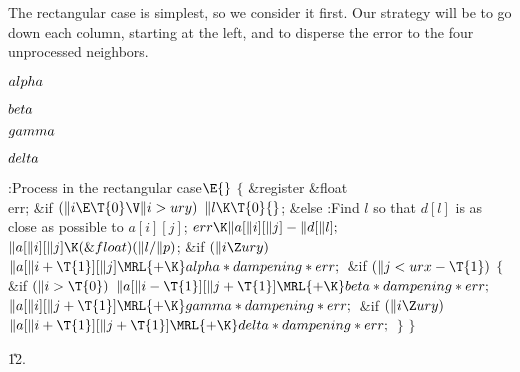 The rectangular case is simplest, so we consider it first. Our strategy
will be to go down each column, starting at the left, and to disperse the
error to the four unprocessed neighbors.

\Y\B\4\D$\\{alpha}$ \5
\par
\B\4\D$\\{beta}$ \5
\par
\B\4\D$\\{gamma}$ \5
\par
\B\4\D$\\{delta}$ \5
\par
\Y\B\4:Process  in the rectangular case\X${}\E{}$\6
${}\{{}$\5
\1\&{register} \&{float} \\{err};\7
\&{if} ${}(\|i\E\T{0}\V\|i>\\{ury}){}$\1\5
${}\|l\K\T{0}{}$;\2\6
\&{else}\1\5
:Find $l$ so that $d[l]$ is as close as possible to $a[i][j]$\X;\2\6
${}\\{err}\K\|a[\|i][\|j]-\|d[\|l];{}$\6
${}\|a[\|i][\|j]\K(\&{float})(\|l/\|p){}$;\6
\&{if} ${}(\|i\Z\\{ury}){}$\1\5
${}\|a[\|i+\T{1}][\|j]\MRL{+{\K}}\\{alpha}*\\{dampening}*\\{err};{}$\2\6
\&{if} ${}(\|j<\\{urx}-\T{1}){}$\5
${}\{{}$\1\6
\&{if} ${}(\|i>\T{0}){}$\1\5
${}\|a[\|i-\T{1}][\|j+\T{1}]\MRL{+{\K}}\\{beta}*\\{dampening}*\\{err};{}$\2\6
${}\|a[\|i][\|j+\T{1}]\MRL{+{\K}}\\{gamma}*\\{dampening}*\\{err};{}$\6
\&{if} ${}(\|i\Z\\{ury}){}$\1\5
${}\|a[\|i+\T{1}][\|j+\T{1}]\MRL{+{\K}}\\{delta}*\\{dampening}*\\{err};{}$\2\6
\4${}\}{}$\2\6
\4${}\}{}$\2\par
\U12.\fi

